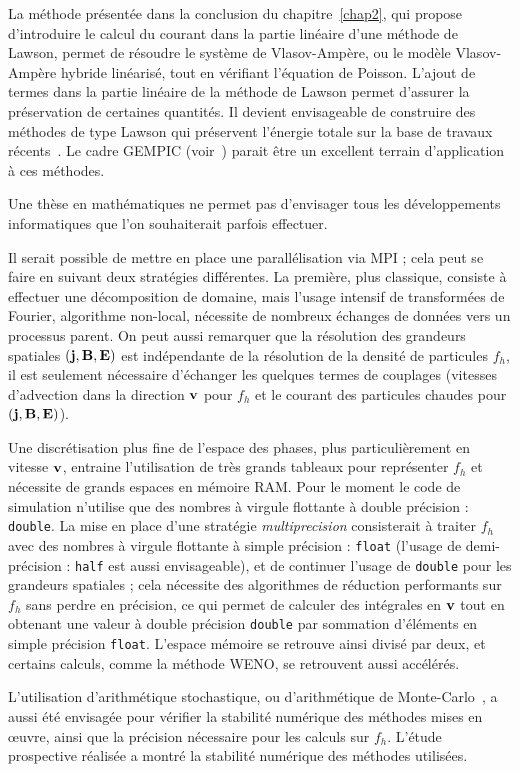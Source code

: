 La méthode présentée dans la conclusion du chapitre~\ref{chap2}, qui propose d'introduire le calcul du courant dans la partie linéaire d'une méthode de Lawson, permet de résoudre le système de Vlasov-Ampère, ou le modèle Vlasov-Ampère hybride linéarisé, tout en vérifiant l'équation de Poisson. L'ajout de termes dans la partie linéaire de la méthode de Lawson permet d'assurer la préservation de certaines quantités. Il devient envisageable de construire des méthodes de type Lawson qui préservent l'énergie totale sur la base de travaux récents~\cite{Mei:2021}. Le cadre GEMPIC (voir~\cite{Kormann:2021}) parait être un excellent terrain d'application à ces méthodes.


Une thèse en mathématiques ne permet pas d'envisager tous les développements informatiques que l'on souhaiterait parfois effectuer.

Il serait possible de mettre en place une parallélisation via MPI ; cela peut se faire en suivant deux stratégies différentes. La première, plus classique, consiste à effectuer une décomposition de domaine, mais l'usage intensif de transformées de Fourier, algorithme non-local, nécessite de nombreux échanges de données vers un processus parent. On peut aussi remarquer que la résolution des grandeurs spatiales $(\vb{j},\vb{B},\vb{E})$ est indépendante de la résolution de la densité de particules $f_h$, il est seulement nécessaire d'échanger les quelques termes de couplages (vitesses d'advection dans la direction $\vb{v}$ pour $f_h$ et le courant des particules chaudes pour $(\vb{j},\vb{B},\vb{E})$).

Une discrétisation plus fine de l'espace des phases, plus particulièrement en vitesse $\vb{v}$, entraine l'utilisation de très grands tableaux pour représenter $f_h$ et nécessite de grands espaces en mémoire RAM. Pour le moment le code de simulation n'utilise que des nombres à virgule flottante à double précision : \texttt{double}. La mise en place d'une stratégie \emph{multiprecision} consisterait à traiter $f_h$ avec des nombres à virgule flottante à simple précision : \texttt{float} (l'usage de demi-précision : \texttt{half} est aussi envisageable), et de continuer l'usage de \texttt{double} pour les grandeurs spatiales ; cela nécessite des algorithmes de réduction performants sur $f_h$ sans perdre en précision, ce qui permet de calculer des intégrales en $\vb{v}$ tout en obtenant une valeur à double précision \texttt{double} par sommation d'éléments en simple précision \texttt{float}. L'espace mémoire se retrouve ainsi divisé par deux, et certains calculs, comme la méthode WENO, se retrouvent aussi accélérés.

L'utilisation d'arithmétique stochastique, ou d'arithmétique de Monte-Carlo~\cite{Parker:1997,Parker:1997a}, a aussi été envisagée pour vérifier la stabilité numérique des méthodes mises en œuvre, ainsi que la précision nécessaire pour les calculs sur $f_h$. L'étude prospective réalisée a montré la stabilité numérique des méthodes utilisées.
